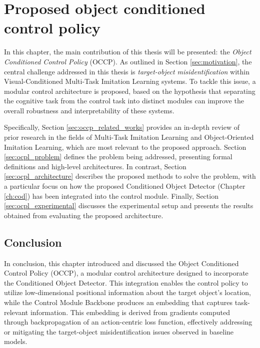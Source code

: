 \chapter{Proposed object conditioned control policy}
\label{ch:occp}
In this chapter, the main contribution of this thesis will be presented: the \textit{Object Conditioned Control Policy} (OCCP). As outlined in Section \ref{sec:motivation}, the central challenge addressed in this thesis is \textit{target-object misidentification} within Visual-Conditioned Multi-Task Imitation Learning systems. To tackle this issue, a modular control architecture is proposed, based on the hypothesis that separating the cognitive task from the control task into distinct modules can improve the overall robustness and interpretability of these systems. 

Specifically, Section \ref{sec:occp_related_works} provides an in-depth review of prior research in the fields of Multi-Task Imitation Learning and Object-Oriented Imitation Learning, which are most relevant to the proposed approach. Section \ref{sec:ocpl_problem} defines the problem being addressed, presenting formal definitions and high-level architectures. In contrast, Section \ref{sec:ocpl_architecture} describes the proposed methods to solve the problem, with a particular focus on how the proposed Conditioned Object Detector (Chapter \ref{ch:cod}) has been integrated into the control module. Finally, Section \ref{sec:ocpl_experimental} discusses the experimental setup and presents the results obtained from evaluating the proposed architecture.







\section{Conclusion}
In conclusion, this chapter introduced and discussed the Object Conditioned Control Policy (OCCP), a modular control architecture designed to incorporate the Conditioned Object Detector. This integration enables the control policy to utilize low-dimensional positional information about the target object's location, while the Control Module Backbone produces an embedding that captures task-relevant information. This embedding is derived from gradients computed through backpropagation of an action-centric loss function, effectively addressing or mitigating the target-object misidentification issues observed in baseline models.


